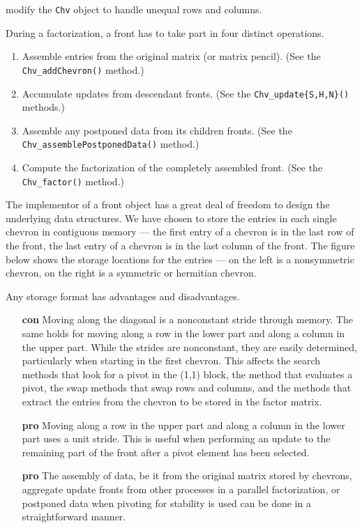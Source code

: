 modify the {\tt Chv} object to handle unequal rows and columns.
\par
During a factorization,
a front has to take part in four distinct operations.
\begin{enumerate}
\item
Assemble entries from the original matrix (or matrix pencil). 
(See the {\tt Chv\_addChevron()} method.)
\item
Accumulate updates from descendant fronts.
(See the {\tt Chv\_update\{S,H,N\}()} methods.)
\item
Assemble any postponed data from its children fronts.
(See the {\tt Chv\_assemblePostponedData()} method.)
\item
Compute the factorization of the completely assembled front.
(See the {\tt Chv\_factor()} method.)
\end{enumerate}
\par
The implementor of a front object has a great deal of freedom to
design the underlying data structures. 
We have chosen to store the entries in each single chevron
in contiguous memory --- the first entry of a chevron is in 
the last row of the front, the last entry of a chevron is 
in the last column of the front.
The figure below shows the storage locations for the 
entries --- on the left is a nonsymmetric chevron, on the right is
a symmetric or hermitian chevron.
\begin{center}
\end{center}
\par
Any storage format has advantages and disadvantages.
\begin{itemize}
\item[{\bf con}]
Moving along the diagonal is a nonconstant stride through memory.
The same holds for moving along a row in the lower part and along a
column in the upper part.
While the strides are nonconstant, they are easily determined,
particularly when starting in the first chevron.
This affects the search methods that look for a pivot in the (1,1)
block, the method that evaluates a pivot, 
the swap methods that swap rows and columns,
and the methods that extract the entries from the chevron to be
stored in the factor matrix.
\item[{{\bf pro}}]
Moving along a row in the upper part and along a column in the
lower part uses a unit stride.
This is useful when performing an update to the remaining part of
the front after a pivot element has been selected.
\item[{\bf pro}]
The assembly of data, be it from the original matrix stored by
chevrons, aggregate update fronts from other processes in a
parallel factorization, or postponed data when pivoting for
stability is used can be done in a straightforward manner.
\end{itemize}
